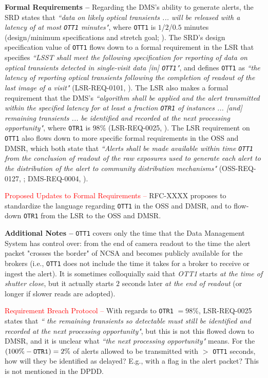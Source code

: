 \documentclass[DM,authoryear,toc]{lsstdoc}
\begin{document}
{\bf Formal Requirements --} Regarding the DMS's ability to generate alerts, the SRD states that {\it ``data on likely optical transients ... will be released with a latency of at most {\tt OTT1} minutes"}, where {\tt OTT1} is $1$/$2$/$0.5$ minutes (design/minimum specifications and stretch goal; ). The SRD's design specification value of {\tt OTT1} flows down to a formal requirement in the LSR that specifies {\it ``LSST shall meet the following specification for reporting of data on optical transients detected in single-visit data [in] {\tt OTT1}"}, and defines {\tt OTT1} as {\it ``the latency of reporting optical transients following the completion of readout of the last image of a visit"} (LSR-REQ-0101, ). The LSR also makes a formal requirement that the DMS's {\it ``algorithm shall be applied and the alert transmitted within the specified latency for at least a fraction {\tt OTR1} of instances ... [and] remaining transients ... be identified and recorded at the next processing opportunity"}, where {\tt OTR1} is $98\%$ (LSR-REQ-0025, ). The LSR requirement on {\tt OTT1} also flows down to more specific formal requirements in the OSS and DMSR, which both state that {\it ``Alerts shall be made available within time {\tt OTT1} from the conclusion of readout of the raw exposures used to generate each alert to the distribution of the alert to community distribution mechanisms"} (OSS-REQ-0127, ; DMS-REQ-0004, ).

\textcolor{red}{Proposed Updates to Formal Requirements --} RFC-XXXX proposes to standardize the language regarding {\tt OTT1} in the OSS and DMSR, and to flow-down {\tt OTR1} from the LSR to the OSS and DMSR. 

{\bf Additional Notes --} {\tt OTT1} covers only the time that the Data Management System has control over: from the end of camera readout to the time the alert packet "crosses the border" of NCSA and becomes publicly available for the brokers (i.e., {\tt OTT1} does not include the time it takes for a broker to receive or ingest the alert). It is sometimes colloquially said that {\it OTT1} starts {\it at the time of shutter close}, but it actually starts $2$ seconds later {\it at the end of readout} (or longer if slower reads are adopted).

\textcolor{red}{Requirement Breach Protocol --} With regards to {\tt OTR1} $=98\%$, LSR-REQ-0025 states that {\it `` the remaining transients so detectable must still be identified and recorded at the next processing opportunity"}, but this is not this flowed down to DMSR, and it is unclear what {\it ``the next processing opportunity"} means. For the $(100 \% - {\tt OTR1}) = 2\%$ of alerts allowed to be transmitted with $>$ {\tt OTT1} seconds, how will they be identified as delayed? E.g., with a flag in the alert packet? This is not mentioned in the DPDD.
\end{document}
